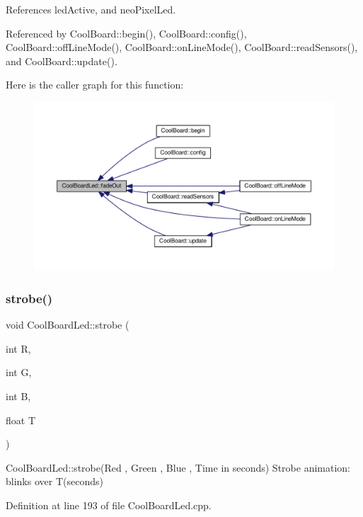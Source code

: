 References led\+Active, and neo\+Pixel\+Led.



Referenced by Cool\+Board\+::begin(), Cool\+Board\+::config(), Cool\+Board\+::off\+Line\+Mode(), Cool\+Board\+::on\+Line\+Mode(), Cool\+Board\+::read\+Sensors(), and Cool\+Board\+::update().

Here is the caller graph for this function\+:
\nopagebreak
\begin{figure}[H]
\begin{center}
\leavevmode
\includegraphics[width=350pt]{de/dc0/class_cool_board_led_a93d545679237e8cc858324367149775c_icgraph}
\end{center}
\end{figure}
\mbox{\label{class_cool_board_led_ad5f0de4c628cbfbf49896042831c64ad}} 
\subsubsection{\texorpdfstring{strobe()}{strobe()}}
{\footnotesize\ttfamily void Cool\+Board\+Led\+::strobe (\begin{DoxyParamCaption}\item[{int}]{R,  }\item[{int}]{G,  }\item[{int}]{B,  }\item[{float}]{T }\end{DoxyParamCaption})}

Cool\+Board\+Led\+::strobe(\+Red , Green , Blue , Time in seconds) Strobe animation\+: blinks over T(seconds) 

Definition at line 193 of file Cool\+Board\+Led.\+cpp.



